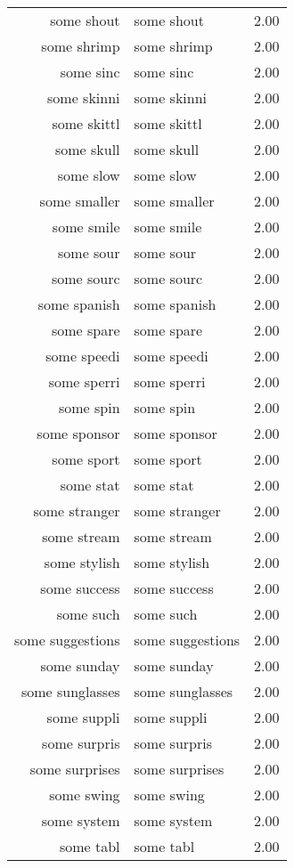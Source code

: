 \begin{table}[ht]
\begin{tabular}{rlr}
  some shout & some shout & 2.00 \\ 
  some shrimp & some shrimp & 2.00 \\ 
  some sinc & some sinc & 2.00 \\ 
  some skinni & some skinni & 2.00 \\ 
  some skittl & some skittl & 2.00 \\ 
  some skull & some skull & 2.00 \\ 
  some slow & some slow & 2.00 \\ 
  some smaller & some smaller & 2.00 \\ 
  some smile & some smile & 2.00 \\ 
  some sour & some sour & 2.00 \\ 
  some sourc & some sourc & 2.00 \\ 
  some spanish & some spanish & 2.00 \\ 
  some spare & some spare & 2.00 \\ 
  some speedi & some speedi & 2.00 \\ 
  some sperri & some sperri & 2.00 \\ 
  some spin & some spin & 2.00 \\ 
  some sponsor & some sponsor & 2.00 \\ 
  some sport & some sport & 2.00 \\ 
  some stat & some stat & 2.00 \\ 
  some stranger & some stranger & 2.00 \\ 
  some stream & some stream & 2.00 \\ 
  some stylish & some stylish & 2.00 \\ 
  some success & some success & 2.00 \\ 
  some such & some such & 2.00 \\ 
  some suggestions & some suggestions & 2.00 \\ 
  some sunday & some sunday & 2.00 \\ 
  some sunglasses & some sunglasses & 2.00 \\ 
  some suppli & some suppli & 2.00 \\ 
  some surpris & some surpris & 2.00 \\ 
  some surprises & some surprises & 2.00 \\ 
  some swing & some swing & 2.00 \\ 
  some system & some system & 2.00 \\ 
  some tabl & some tabl & 2.00 \\ 

\end{tabular}
\end{table}
